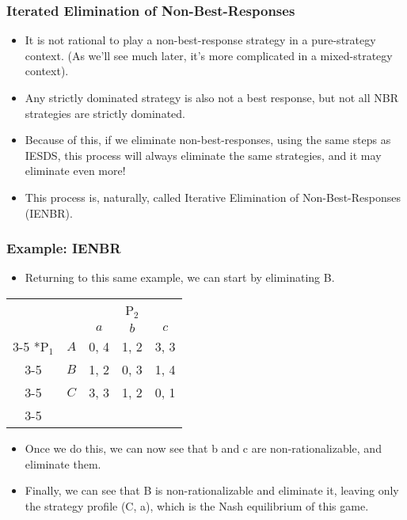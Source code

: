 \begin{frame}
\frametitle{Iterated Elimination of Non-Best-Responses}
\begin{itemize}
	\item It is not rational to play a non-best-response strategy in a pure-strategy context. (As we'll see much later, it's more complicated in a mixed-strategy context).
	\item Any strictly dominated strategy is also not a best response, but not all NBR strategies are strictly dominated.
	\item Because of this, if we eliminate non-best-responses, using the same steps as IESDS, this process will always eliminate the same strategies, and it may eliminate even more!
	\item This process is, naturally, called Iterative Elimination of Non-Best-Responses (IENBR).
\end{itemize}
\end{frame}

\begin{frame}
\frametitle{Example: IENBR}
\begin{itemize}
	\item Returning to this same example, we can start by eliminating B.
\end{itemize}
\begin{table}[h]
	\centering
	\setlength{\extrarowheight}{2pt}
	\begin{tabular}{cc|c|c|c|}
	& \multicolumn{1}{c}{} & \multicolumn{3}{c}{P$_2$}\\
	& \multicolumn{1}{c}{} & \multicolumn{1}{c}{$a$} & \multicolumn{1}{c}{$b$} & \multicolumn{1}{c}{$c$} \\\cline{3-5}
	\multirow{3}*{P$_1$}  & $A$ & 0, 4 & 1, 2 & 3, 3 \\\cline{3-5}
	& $B$ & 1, 2 & 0, 3 & 1, 4 \\\cline{3-5}
	& $C$ & 3, 3 & 1, 2 & 0, 1 \\\cline{3-5}
	\end{tabular}
\end{table}
\begin{itemize}
	\item Once we do this, we can now see that b and c are non-rationalizable, and eliminate them.
	\item Finally, we can see that B is non-rationalizable and eliminate it, leaving only the strategy profile (C, a), which is the Nash equilibrium of this game.
\end{itemize}
\end{frame}

